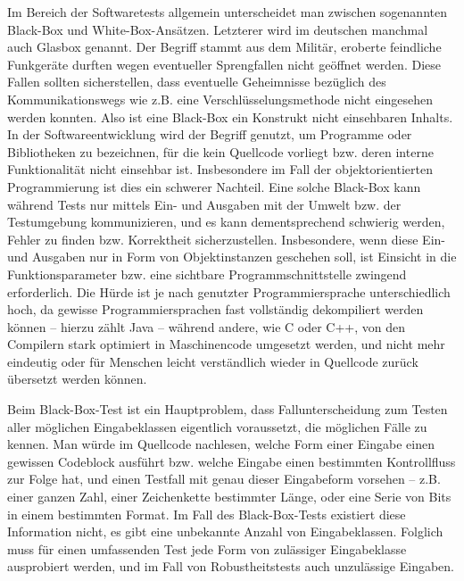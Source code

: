 Im Bereich der Softwaretests allgemein unterscheidet man zwischen
sogenannten \glqq{}Black-Box\grqq{} und 
\glqq{}White-Box\grqq{}-Ansätzen. Letzterer wird im
deutschen manchmal auch Glasbox genannt. Der Begriff stammt
aus dem Militär, eroberte feindliche Funkgeräte durften wegen eventueller
Sprengfallen nicht geöffnet werden. Diese Fallen sollten sicherstellen,
dass eventuelle Geheimnisse bezüglich des Kommunikationswegs wie
z.B. eine Verschlüsselungsmethode nicht eingesehen werden konnten.
Also ist eine \glqq{}Black-Box\grqq{} ein Konstrukt nicht einsehbaren
Inhalts. In der Softwareentwicklung wird der Begriff genutzt,
um Programme oder Bibliotheken zu bezeichnen, für die kein
Quellcode vorliegt bzw. deren interne Funktionalität nicht einsehbar 
ist\cite{bookblackbox}. Insbesondere im Fall der objektorientierten
Programmierung ist dies ein schwerer Nachteil. Eine solche Black-Box
kann während Tests nur mittels Ein- und Ausgaben mit der Umwelt bzw. der
Testumgebung kommunizieren, und es kann dementsprechend
schwierig werden, Fehler zu finden bzw. Korrektheit sicherzustellen.
Insbesondere, wenn diese Ein- und Ausgaben nur in Form von Objektinstanzen
geschehen soll, ist Einsicht in die Funktionsparameter bzw. eine sichtbare
Programmschnittstelle zwingend erforderlich. Die Hürde ist
je nach genutzter Programmiersprache unterschiedlich hoch,
da gewisse Programmiersprachen fast vollständig dekompiliert werden
können -- hierzu zählt Java -- während andere, wie C oder C++,
von den Compilern stark optimiert in Maschinencode umgesetzt werden,
und nicht mehr eindeutig oder für Menschen leicht verständlich 
wieder in Quellcode zurück übersetzt werden können.

Beim Black-Box-Test ist ein Hauptproblem, dass Fallunterscheidung
zum Testen aller möglichen Eingabeklassen eigentlich voraussetzt,
die möglichen Fälle zu kennen. Man würde im Quellcode nachlesen,
welche Form einer Eingabe einen gewissen Codeblock ausführt bzw.
welche Eingabe einen bestimmten Kontrollfluss zur Folge hat, und einen Testfall
mit genau dieser Eingabeform vorsehen -- z.B. einer ganzen Zahl, einer
Zeichenkette bestimmter Länge, oder eine Serie von Bits in einem
bestimmten Format. Im Fall des Black-Box-Tests existiert diese Information
nicht, es gibt eine unbekannte Anzahl von Eingabeklassen. Folglich
muss für einen umfassenden Test jede Form von zulässiger
Eingabeklasse ausprobiert werden, und im Fall von Robustheitstests
auch unzulässige Eingaben.

